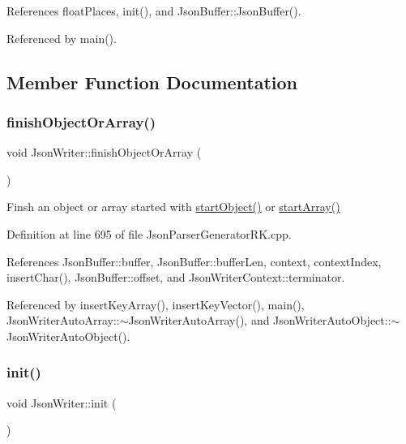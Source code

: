 References float\+Places, init(), and Json\+Buffer\+::\+Json\+Buffer().



Referenced by main().



\subsection{Member Function Documentation}
\mbox{\label{class_json_writer_adbd96b46b0679bea3a066c0e62bd86b0}} 
\subsubsection{\texorpdfstring{finish\+Object\+Or\+Array()}{finishObjectOrArray()}}
{\footnotesize\ttfamily void Json\+Writer\+::finish\+Object\+Or\+Array (\begin{DoxyParamCaption}{ }\end{DoxyParamCaption})}



Finsh an object or array started with \hyperlink{class_json_writer_a43d1a78bf211a2f12cfe9253462717ae}{start\+Object()} or \hyperlink{class_json_writer_a7ccfcbf66a8ed9a2728e6f6ae4b705ec}{start\+Array()} 



Definition at line 695 of file Json\+Parser\+Generator\+R\+K.\+cpp.



References Json\+Buffer\+::buffer, Json\+Buffer\+::buffer\+Len, context, context\+Index, insert\+Char(), Json\+Buffer\+::offset, and Json\+Writer\+Context\+::terminator.



Referenced by insert\+Key\+Array(), insert\+Key\+Vector(), main(), Json\+Writer\+Auto\+Array\+::$\sim$\+Json\+Writer\+Auto\+Array(), and Json\+Writer\+Auto\+Object\+::$\sim$\+Json\+Writer\+Auto\+Object().

\mbox{\label{class_json_writer_ad7dea044e659a5e1d368ff4628e9eea6}} 
\subsubsection{\texorpdfstring{init()}{init()}}
{\footnotesize\ttfamily void Json\+Writer\+::init (\begin{DoxyParamCaption}{ }\end{DoxyParamCaption})}



